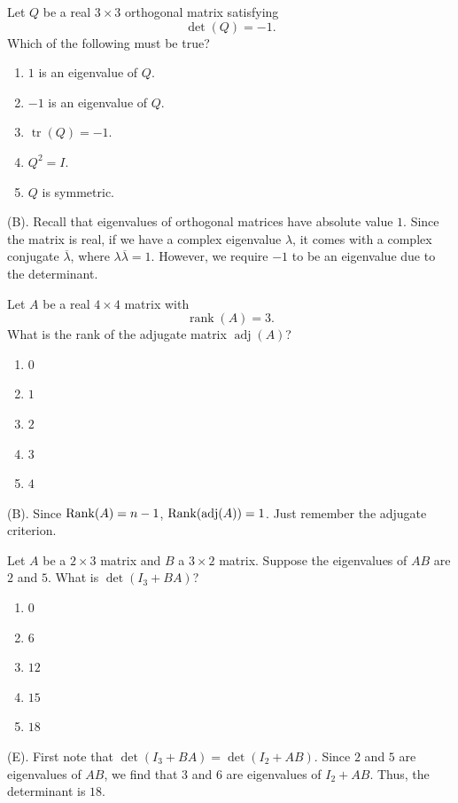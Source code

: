 \begin{exercise}
Let $Q$ be a real $3\times3$ orthogonal
matrix satisfying
\[
\det(Q)=-1.
\]
Which of the following must be true?
\begin{enumerate}[label=(\Alph*)]
    \item $1$ is an eigenvalue of $Q$.
    \item $-1$ is an eigenvalue of $Q$.
    \item $\operatorname{tr}(Q)=-1$.
    \item $Q^2=I$.
    \item $Q$ is symmetric.
\end{enumerate}
\end{exercise}
\begin{solution}
(B). Recall that eigenvalues of orthogonal matrices have absolute value $1$. Since the matrix 
is real, if we have a complex eigenvalue $\lambda$, it comes with a complex conjugate $\overline{\lambda}$,
where $\lambda \overline{\lambda} = 1$. However, we require $-1$ to be an eigenvalue due to the determinant.
\end{solution}

\begin{exercise}
Let $A$ be a real $4\times4$ matrix with
\[
\operatorname{rank}(A)=3.
\]
What is the rank of the adjugate matrix $\operatorname{adj}(A)$?
\begin{enumerate}[label=(\Alph*)]
    \item $0$
    \item $1$
    \item $2$
    \item $3$
    \item $4$
\end{enumerate}
\end{exercise}
\begin{solution}
(B). Since $\mathrm{Rank}(A) = n - 1$, $\mathrm{Rank} (\operatorname{adj}(A)) = 1$. Just remember the adjugate 
criterion.
\end{solution}

\begin{exercise}
Let $A$ be a $2\times3$ matrix and $B$
a $3\times2$ matrix. Suppose the eigenvalues of $AB$ are $2$ and $5$. What is
$\det(I_3+BA)$?
\begin{enumerate}[label=(\Alph*)]
    \item $0$
    \item $6$
    \item $12$
    \item $15$
    \item $18$
\end{enumerate}
\end{exercise}
\begin{solution}
(E). First note that $\det(I_3 + BA) = \det(I_2 + AB)$. Since $2$ and $5$ are eigenvalues 
of $AB$, we find that $3$ and $6$ are eigenvalues of $I_2 + AB$. Thus, the determinant is $18$.
\end{solution}

